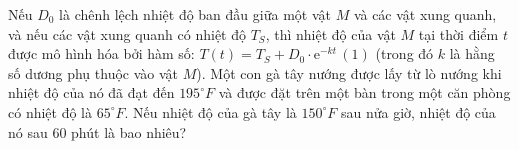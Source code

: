 \begin{ex}%
	Nếu $D_0$ là  chênh lệch nhiệt độ ban đầu giữa một vật $M$ và các vật xung quanh, và nếu các vật xung quanh có nhiệt độ $T_S$, thì nhiệt độ của vật $M$ tại thời điểm $t$ được mô hình hóa bởi hàm số: $T(t)=T_S+D_0 \cdot\mathrm{e}^{-kt}\,(1)$ (trong đó $k$ là hằng số dương phụ thuộc vào vật $M$).
	Một con gà tây nướng  được lấy từ lò nướng khi nhiệt độ của nó đã đạt đến $195^\circ F$ và được đặt trên một bàn trong một căn phòng có nhiệt độ là $65^\circ F$.
	Nếu nhiệt  độ của gà tây là $150^\circ F$ sau nửa giờ, nhiệt độ của nó sau $60$ phút là bao nhiêu?
\end{ex}

